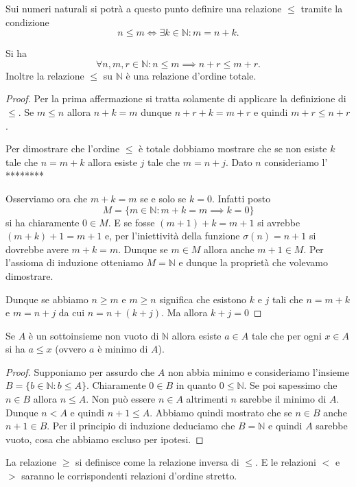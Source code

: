 \documentclass[italian,a4paper,twosides,headinclude]{scrbook}
\newcommand{\NN}{\mathbb N}
\begin{document}
Sui numeri naturali
si potrà a questo punto definire una relazione $\le$ tramite la condizione
\[
  n \le m \iff \exists k \in \NN \colon m = n+k.
\]

\begin{theorem}
Si ha
\[
 \forall n,m,r\in \NN \colon n\le m \implies n+r \le m+r.
\]
Inoltre
la relazione $\le$ su $\NN$ è una relazione d'ordine totale.
\end{theorem}
\begin{proof}
Per la prima affermazione si tratta solamente di applicare la definizione
di $\le$. Se $m\le n$ allora $n+k = m$ dunque $n+r+k = m+r$
e quindi $m+r\le n+r$.

Per dimostrare che l'ordine $\le$ è totale dobbiamo mostrare che se non esiste
$k$ tale che $n = m+k$ allora esiste $j$ tale che $m=n+j$.
Dato $n$ consideriamo l' ********

Osserviamo ora che $m+k = m$ se e solo se $k=0$. Infatti posto
\[
M=\{m\in \NN\colon m+k = m \implies k=0 \}
\]
si ha chiaramente $0\in M$. E se fosse $(m+1)+k=m+1$ si avrebbe $(m+k)+1=m+1$ e,
per l'iniettività della funzione $\sigma(n)=n+1$ si dovrebbe avere $m+k=m$.
Dunque se $m\in M$ allora anche $m+1\in M$. Per l'assioma di induzione otteniamo
$M=\NN$ e dunque la proprietà che volevamo dimostrare.

Dunque se abbiamo $n\ge m$ e $m\ge n$ significa che esistono $k$ e $j$
tali che $n=m+k$ e $m=n+j$ da cui $n=n+(k+j)$. Ma allora $k+j=0$
\end{proof}

\begin{theorem}[buon ordinamento di $\NN$]
Se $A$ è un sottoinsieme non vuoto di $\NN$ allora esiste $a \in A$
tale che per ogni $x\in A$ si ha $a\le x$ (ovvero $a$ è minimo di $A$).
\end{theorem}
%
\begin{proof}
Supponiamo per assurdo che $A$ non abbia minimo e consideriamo l'insieme
$B=\{b\in \NN\colon b \le A\}$.
Chiaramente $0\in B$ in quanto $0\le \NN$. Se poi sapessimo che $n\in B$
allora $n\le A$. Non può essere $n\in A$ altrimenti $n$ sarebbe il minimo di $A$. Dunque $n < A$ e quindi $n+1 \le A$. Abbiamo quindi mostrato che se $n\in B$ anche $n+1\in B$. Per il principio di induzione deduciamo che $B=\NN$ e quindi $A$ sarebbe vuoto, cosa che abbiamo escluso per ipotesi.
\end{proof}



La relazione $\ge$ si definisce come la relazione inversa di $\le$.
E le relazioni $<$ e $>$ saranno le corrispondenti relazioni d'ordine stretto.
\end{document}
